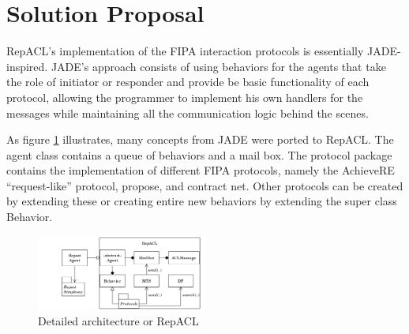 \section{Solution Proposal} %
\label{sec:proposal}

RepACL's implementation of the FIPA interaction protocols is essentially JADE-inspired. JADE's approach consists of using behaviors for the agents that take the role of initiator or responder and provide be basic functionality of each protocol, allowing the programmer to implement his own handlers for the messages while maintaining all the communication logic behind the scenes.

As figure \ref{fig:arch} illustrates, many concepts from JADE were ported to RepACL. The agent class contains a queue of behaviors and a mail box. The protocol package contains the implementation of different FIPA protocols, namely the AchieveRE ``request-like'' protocol, propose, and contract net. Other protocols can be created by extending these or creating entire new behaviors by extending the super class Behavior.

\begin{figure}[h]
	\centering
	\includegraphics[width=0.5\textwidth]{figures/repacl_arch.png}
	\caption{Detailed architecture or RepACL}
	\label{fig:arch}
\end{figure}

